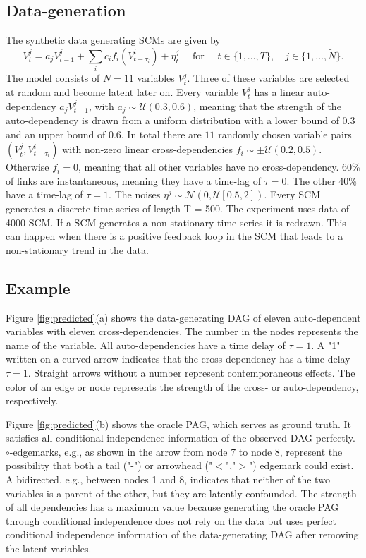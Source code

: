 \documentclass[conference]{IEEEtran}
\begin{document}
\subsection{Data-generation}
The synthetic data generating SCMs are given by
\begin{equation}
V_{t}^{j}=a_{j} V_{t-1}^{j}+\sum_{i} c_{i} f_{i}\left(V_{t-\tau_{i}}^{i}\right)+\eta_{t}^{j} \quad \text { for } \quad t \in\{1, \ldots, T\}, \quad j \in\{1, \ldots, \tilde{N} \}.
\end{equation}
The model consists of $\tilde{N}=11$ variables $V_t^j$. Three of these variables are selected at random and become latent later on.
Every variable $V_t^j$ has a linear auto-dependency $a_j V_{t-1}^{j}$, with $a_j \sim \mathcal{U}(0.3,0.6)$, meaning that the strength of the auto-dependency is drawn from a uniform distribution with a lower bound of 0.3 and an upper bound of 0.6.
In total there are $11$ randomly chosen variable pairs $(V_t^j,V^i_{t-\tau_i})$ with non-zero linear cross-dependencies $f_i \sim \pm \mathcal{U}(0.2,0.5)$. Otherwise $f_i=0$, meaning that all other variables have no cross-dependency.
60\% of links are instantaneous, meaning they have a time-lag of $\tau =0$. The other 40\% have a time-lag of $\tau=1$.
The noises $\eta^{j} \sim \mathcal{N}(0,\mathcal{U}[0.5,2])$.
Every SCM generates a discrete time-series of length T = 500. The experiment uses data of 4000 SCM. If a SCM generates a non-stationary time-series it is redrawn. This can happen when there is a positive feedback loop in the SCM that leads to a non-stationary trend in the data.


\subsection{Example}
Figure \ref{fig:predicted}(a) shows the data-generating DAG of eleven auto-dependent variables with eleven cross-dependencies.
The number in the nodes represents the name of the variable.
All auto-dependencies have a time delay of $\tau=1$.
A "1" written on a curved arrow indicates that the cross-dependency has a time-delay $\tau=1$. Straight arrows without a number represent contemporaneous effects. 
The color of an edge or node represents the strength of the cross- or auto-dependency, respectively.

Figure \ref{fig:predicted}(b) shows the oracle PAG, which serves as ground truth. It satisfies all conditional independence information of the observed DAG perfectly.
$\circ$-edgemarks, e.g., as shown in the arrow from node 7 to node 8, represent the possibility that both a tail ("-") or arrowhead ("$<$","$>$") edgemark could exist.
A bidirected, e.g., between nodes 1 and 8, indicates that neither of the two variables is a parent of the other, but they are latently confounded.
The strength of all dependencies has a maximum value because generating the oracle PAG through conditional independence does not rely on the data but uses perfect conditional independence information of the data-generating DAG after removing the latent variables.
\end{document}
